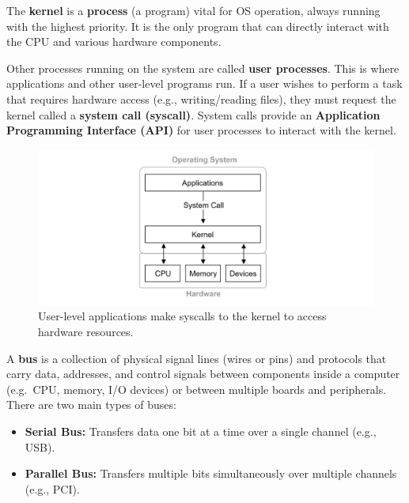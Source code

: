\begin{Def}

    \label{def:kernel}

    The \textbf{kernel} is a \textbf{process} (a program) vital for OS operation, always running with the highest 
    priority. It is the only program that can directly interact with the CPU and various hardware components.

    Other processes running on the system are called \textbf{user processes}. This is where applications and other user-level programs 
    run. If a user wishes to perform a task that requires hardware access (e.g., writing/reading files), they must request the kernel called a \textbf{system call (syscall)}. System 
    calls provide an \textbf{Application Programming Interface (API)} for user processes to interact with the kernel.
\end{Def}

\vspace{-1em}
\begin{figure}[ht!]
    \centering
    \includegraphics[width=\textwidth]{Sections/cpu/kernel.png}
    \caption{User-level applications make syscalls to the kernel to access hardware resources.}
    \label{fig:kernel}
\end{figure}

\newpage

\begin{Def}[Bus]

    A \textbf{bus} is a collection of physical signal lines (wires or pins) and protocols that carry data, addresses, and control signals between 
    components inside a computer (e.g.\ CPU, memory, I/O devices) or between multiple boards and peripherals. There are two main types of buses:
    \begin{itemize}
        \item \textbf{Serial Bus:} Transfers data one bit at a time over a single channel (e.g., USB).
        \item \textbf{Parallel Bus:} Transfers multiple bits simultaneously over multiple channels (e.g., PCI).
    \end{itemize}
\end{Def}

